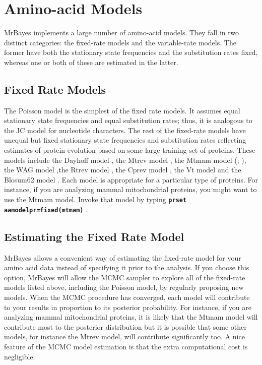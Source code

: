 \documentclass[12pt]{book}
\newcommand{\ttt}[1]{\texttt{#1} }
\newcommand{\tb}[1]{\ttt{\textbf{#1}} }
\begin{document}
\section{Amino-acid Models}
\label{amino-acidModels}

MrBayes implements a large number of amino-acid models. They fall in two distinct categories: the
fixed-rate models and the variable-rate models. The former have both the stationary state
frequencies and the substitution rates fixed, whereas one or both of these are estimated in the
latter.

\subsection{Fixed Rate Models}
The Poisson model \citep{bishop87} is the simplest of the fixed rate models. It assumes equal
stationary state frequencies and equal substitution rates; thus, it is analogous to the JC model
for nucleotide characters. The rest of the fixed-rate models have unequal but fixed stationary
state frequencies and substitution rates reflecting estimates of protein evolution based on some
large training set of proteins. These models include the Dayhoff model \citep{dayhoff78}, the Mtrev
model \citep{adachi96}, the Mtmam model (\citet{cao98}; \citet{yang98}), the WAG model
\citep{whelan01},the Rtrev model \citep{dimmic02}, the Cprev model \citep{adachi00}, the Vt model
\citep{muller00} and the Blosum62 model \citep{henikoff92}. Each model is appropriate for a
particular type of proteins. For instance, if you are analyzing mammal mitochondrial proteins, you
might want to use the Mtmam model. Invoke that model by typing \tb{prset aamodelpr=fixed(mtmam)}.

\subsection{Estimating the Fixed Rate Model}
MrBayes allows a convenient way of estimating the fixed-rate model for your amino acid data instead
of specifying it prior to the analysis. If you choose this option, MrBayes will allow the MCMC
sampler to explore all of the fixed-rate models listed above, including the Poisson model, by
regularly proposing new models. When the MCMC procedure has converged, each model will contribute
to your results in proportion to its posterior probability. For instance, if you are analyzing
mammal mitochondrial proteins, it is likely that the Mtmam model will contribute most to the
posterior distribution but it is possible that some other models, for instance the Mtrev model,
will contribute significantly too. A nice feature of the MCMC model estimation is that the extra
computational cost is negligible.
\end{document}
